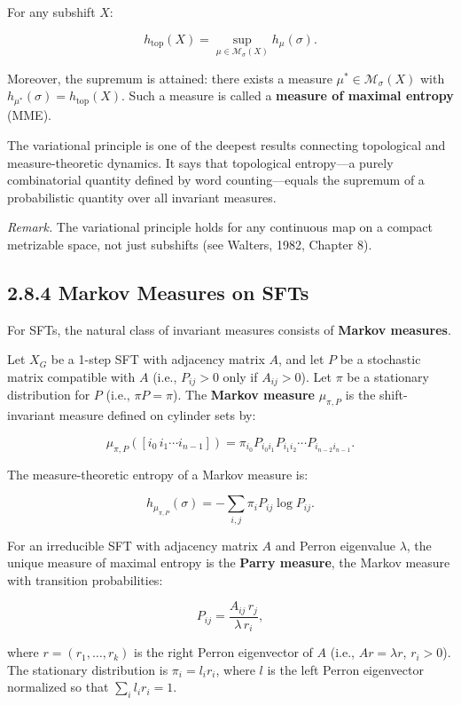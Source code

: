 \begin{theorem}
For any subshift $X$:

\[h_{\mathrm{top}}(X) = \sup_{\mu \in \mathcal{M}_\sigma(X)} h_\mu(\sigma).\]

Moreover, the supremum is attained: there exists a measure $\mu^* \in \mathcal{M}_\sigma(X)$ with $h_{\mu^*}(\sigma) = h_{\mathrm{top}}(X)$. Such a measure is called a \textbf{measure of maximal entropy} (MME).

The variational principle is one of the deepest results connecting topological and measure-theoretic dynamics. It says that topological entropy---a purely combinatorial quantity defined by word counting---equals the supremum of a probabilistic quantity over all invariant measures.

\textit{Remark.} The variational principle holds for any continuous map on a compact metrizable space, not just subshifts (see Walters, 1982, Chapter 8).
\end{theorem}

\subsection{2.8.4 Markov Measures on SFTs}

For SFTs, the natural class of invariant measures consists of \textbf{Markov measures}.

\begin{definition}
Let $X_G$ be a 1-step SFT with adjacency matrix $A$, and let $P$ be a stochastic matrix compatible with $A$ (i.e., $P_{ij} > 0$ only if $A_{ij} > 0$). Let $\pi$ be a stationary distribution for $P$ (i.e., $\pi P = \pi$). The \textbf{Markov measure} $\mu_{\pi, P}$ is the shift-invariant measure defined on cylinder sets by:

\[\mu_{\pi, P}([i_0 \, i_1 \cdots i_{n-1}]) = \pi_{i_0} P_{i_0 i_1} P_{i_1 i_2} \cdots P_{i_{n-2} i_{n-1}}.\]

The measure-theoretic entropy of a Markov measure is:

\[h_{\mu_{\pi,P}}(\sigma) = -\sum_{i,j} \pi_i P_{ij} \log P_{ij}.\]
\end{definition}

\begin{theorem}[Parry, 1964]
For an irreducible SFT with adjacency matrix $A$ and Perron eigenvalue $\lambda$, the unique measure of maximal entropy is the \textbf{Parry measure}, the Markov measure with transition probabilities:

\[P_{ij} = \frac{A_{ij} \, r_j}{\lambda \, r_i},\]

where $r = (r_1, \ldots, r_k)$ is the right Perron eigenvector of $A$ (i.e., $Ar = \lambda r$, $r_i > 0$). The stationary distribution is $\pi_i = l_i r_i$, where $l$ is the left Perron eigenvector normalized so that $\sum_i l_i r_i = 1$.
\end{theorem}

